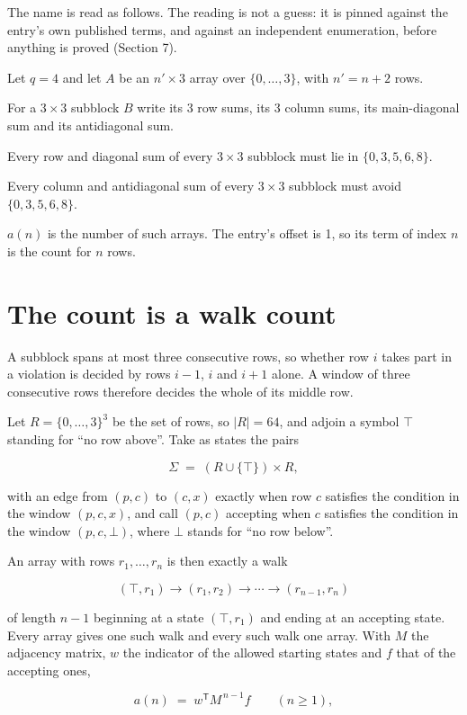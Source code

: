 \documentclass[11pt]{article}
\theoremstyle{definition}
\begin{document}
The name is read as follows. The reading is not a guess: it is pinned against the entry's own published terms, and against an independent enumeration, before anything is proved (Section 7).

Let $q = 4$ and let $A$ be an $n' \times 3$ array over $\{0,\dots,3\}$, with $n' = n + 2$ rows.

For a $3\times3$ subblock $B$ write its 3 row sums, its 3 column sums, its main-diagonal sum and its antidiagonal sum.

Every row and diagonal sum of every $3\times3$ subblock must lie in $\{0, 3, 5, 6, 8\}$.

Every column and antidiagonal sum of every $3\times3$ subblock must avoid $\{0, 3, 5, 6, 8\}$.

$a(n)$ is the number of such arrays. The entry's offset is 1, so its term of index $n$ is the count for $n$ rows.

\section{The count is a walk count}

A subblock spans at most three consecutive rows, so whether row $i$ takes part in a violation is decided by rows $i-1$, $i$ and $i+1$ alone. A window of three consecutive rows therefore decides the whole of its middle row.

Let $R = \{0,\dots,3\}^{3}$ be the set of rows, so $|R| = 64$, and adjoin a symbol $\top$ standing for ``no row above''. Take as states the pairs

\[\Sigma \;=\; (R \cup \{\top\}) \times R,\]

with an edge from $(p,c)$ to $(c,x)$ exactly when row $c$ satisfies the condition in the window $(p,c,x)$, and call $(p,c)$ accepting when $c$ satisfies the condition in the window $(p,c,\bot)$, where $\bot$ stands for ``no row below''.

An array with rows $r_1,\dots,r_n$ is then exactly a walk

\[(\top,r_1) \to (r_1,r_2) \to \cdots \to (r_{n-1},r_n)\]

of length $n-1$ beginning at a state $(\top,r_1)$ and ending at an accepting state. Every array gives one such walk and every such walk one array. With $M$ the adjacency matrix, $w$ the indicator of the allowed starting states and $f$ that of the accepting ones,

\[a(n) \;=\; w^{\mathsf T} M^{\,n-1} f \qquad (n \ge 1),\]
\end{document}
